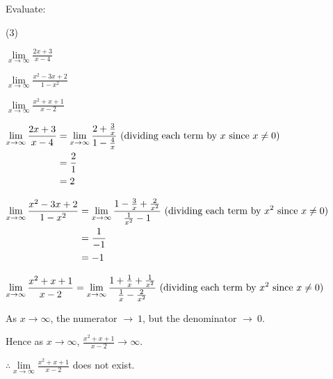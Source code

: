 \documentclass[11pt,a4paper]{book}
\begin{document}
\begin{example}

Evaluate:

\begin{tasks}[label=(\alph*),label-width=3.5ex] (3)

\task  ${\displaystyle \mathop{\lim}\limits _{x\to\infty}\frac{2x+3}{x-4}}$

\task  ${\displaystyle \mathop{\lim}\limits _{x\to\infty}\frac{x^{2}-3x+2}{1-x^{2}}}$

\task  ${\displaystyle \mathop{\lim}\limits _{x\to\infty}\frac{x^{2}+x+1}{x-2}}$

\end{tasks}

\Solution

\begin{tasks}[label=(\alph*),label-width=3.5ex]

\task
$
\begin{aligned}[t]
\mathop{\lim}\limits _{x\to\infty}\frac{2x+3}{x-4} & ={\displaystyle \mathop{\lim}\limits _{x\to\infty}\frac{2+\frac{3}{x}}{1-\frac{4}{x}}\text{ (dividing each term by \ensuremath{x} since \ensuremath{x\neq0})}}\\
 & =\frac{2}{1}\\
 & =2
\end{aligned}
$

\task
$
\begin{aligned}[t]
\mathop{\lim}\limits _{x\to\infty}\frac{x^{2}-3x+2}{1-x^{2}} & =\mathop{\lim}\limits _{x\to\infty}\frac{1-\frac{3}{x}+\frac{2}{x^{2}}}{\frac{1}{x^{2}}-1}\text{ (dividing each term by \ensuremath{x^{2}} since \ensuremath{x\neq0})}\\
 & =\frac{1}{-1}\\
 & =-1
\end{aligned}
$

\task
$
\begin{aligned}[t]
\mathop{\lim}\limits _{x\to\infty}\frac{x^{2}+x+1}{x-2}=\mathop{\lim}\limits _{x\to\infty}\frac{1+\frac{1}{x}+\frac{1}{x^{2}}}{\frac{1}{x}-\frac{2}{x^{2}}}\text{ (dividing each term by \ensuremath{x^{2}} since \ensuremath{x\neq0})}
\end{aligned}
$

As $x\to\infty$, the numerator $\to\:1$, but the denominator $\to\:0$.

Hence as $x\to\infty$, ${\displaystyle \frac{x^{2}+x+1}{x-2}\to\infty}$.

${\displaystyle \therefore\mathop{\lim}\limits _{x\to\infty}\frac{x^{2}+x+1}{x-2}}$
does not exist.

\end{tasks}

\end{example}
\end{document}
